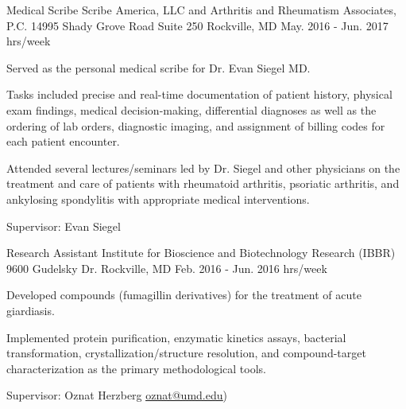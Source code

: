 \begin{cventries}
  \cventry
    {Medical Scribe} %
    {Scribe America, LLC and Arthritis and Rheumatism Associates, P.C.} %
    {14995 Shady Grove Road \newline Suite 250 \newline Rockville, MD} %
    {May. 2016 - Jun. 2017  hrs/week} %
    {
      \begin{cvitems} %
        \item {Served as the personal medical scribe for Dr. Evan Siegel MD.}
        \item{Tasks included precise and real-time documentation of patient history, physical exam findings, medical decision-making, differential diagnoses as well as the ordering of lab orders, diagnostic imaging, and assignment of billing codes for each patient encounter.}
        \item{Attended several lectures/seminars led by Dr. Siegel and other physicians on the treatment and care of patients with rheumatoid arthritis, psoriatic arthritis, and ankylosing spondylitis with appropriate medical interventions.}
        \item{Supervisor: Evan Siegel}
      \end{cvitems}
    }

  \cventry
    {Research Assistant} %
    {Institute for Bioscience and Biotechnology Research (IBBR) } %
    {9600 Gudelsky Dr. \newline
Rockville, MD} %
    {Feb. 2016 - Jun. 2016  hrs/week} %
    {
      \begin{cvitems} %
        \item {Developed compounds (fumagillin derivatives) for the treatment of acute giardiasis.}
        \item{Implemented protein purification, enzymatic kinetics assays, bacterial transformation, crystallization/structure resolution, and compound-target characterization as the primary methodological tools.}
        \item{Supervisor: Oznat Herzberg
        {\underline{\href{mailto:oznat@umd.edu}{oznat@umd.edu}}})}
      \end{cvitems}
    }


\end{cventries}
